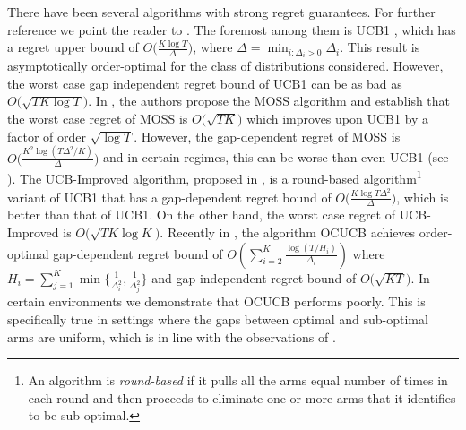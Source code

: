 	There have been several algorithms with strong regret guarantees. For further reference we point the reader to \cite{bubeck2012bandits}. The foremost among them is UCB1 \cite{auer2002finite}, which has a regret upper bound of $O\big(\frac{K\log T}{\Delta}\big)$, where $\Delta = \min_{i:\Delta_i>0} \Delta_i$. This result is asymptotically order-optimal for the class of distributions considered. However, the worst case gap independent regret bound of UCB1  can be as bad as $O \big(\sqrt{TK\log T}\big)$.  In \cite{audibert2009minimax}, the authors propose the MOSS algorithm and establish that the worst case regret of MOSS is $O\big(\sqrt{TK}\big)$ which improves upon UCB1 by a factor of order $\sqrt{\log T}$. However, the gap-dependent regret of MOSS is  $O\big(\frac{K^{2}\log\left(T\Delta^{2}/K\right)}{\Delta}\big)$ and in certain regimes, this can be worse than even UCB1 (see \cite{audibert2009minimax,lattimore2015optimally}). The UCB-Improved algorithm, proposed in \cite{auer2010ucb}, is a round-based algorithm\footnote{An algorithm is \textit{round-based} if it pulls all the arms equal number of times in each round and then proceeds to eliminate one or more arms that it identifies to be sub-optimal.} variant of UCB1 that 
has a gap-dependent regret bound of $O\big(\frac{K\log T\Delta^{2}}{\Delta}\big)$, which is better than that of UCB1. On the other hand, the worst case regret of UCB-Improved is $O\big(\sqrt{TK\log K}\big)$. Recently in \cite{lattimore2015optimally}, the algorithm OCUCB achieves order-optimal gap-dependent regret bound of $O\left(\sum_{i=2}^{K}\frac{\log\left(T/H_i\right)}{\Delta_i}\right)$ where $H_i=\sum_{j=1}^{K}\min\lbrace \frac{1}{\Delta_i^2},\frac{1}{\Delta_j^2}\rbrace$ and gap-independent regret bound of $O\big( \sqrt{KT}\big)$. 
In certain environments we demonstrate that OCUCB performs poorly. This is specifically true in settings where the gaps between optimal and sub-optimal arms are uniform, which is in line with the observations of \cite{lattimore2015optimally}.


